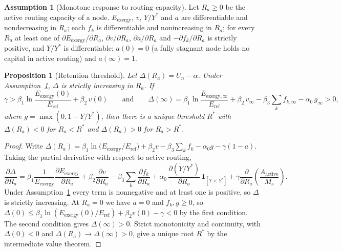 \documentclass[11pt,a4paper]{article}
\theoremstyle{definition}
\newtheorem{assumption}{Assumption}
\theoremstyle{plain}
\newtheorem{proposition}{Proposition}
\theoremstyle{remark}
\begin{document}
\begin{assumption}[Monotone response to routing capacity]\label{ass:mono}
Let $R_a \ge 0$ be the active routing capacity of a node. $E_{\mathrm{exergy}}$, $v$, $Y/Y^{*}$ and $a$ are differentiable and nondecreasing in $R_a$; each $f_k$ is differentiable and nonincreasing in $R_a$; for every $R_a$ at least one of $\partial E_{\mathrm{exergy}}/\partial R_a$, $\partial v/\partial R_a$, $\partial a/\partial R_a$ and $-\partial f_k/\partial R_a$ is strictly positive, and $Y/Y^{*}$ is differentiable; $a(0) = 0$ (a fully stagnant node holds no capital in active routing) and $a(\infty) = 1$.
\end{assumption}

\begin{proposition}[Retention threshold]\label{prop:retention}
Let $\Delta(R_a) = U_n - \alpha$. Under Assumption~\ref{ass:mono}, $\Delta$ is strictly increasing in $R_a$. If
\begin{equation}
\gamma > \beta_1 \ln\!\frac{E_{\mathrm{exergy}}(0)}{E_{\mathrm{ref}}} + \beta_2\, v(0)
\qquad\text{and}\qquad
\Delta(\infty) = \beta_1 \ln\!\frac{E_{\mathrm{exergy},\infty}}{E_{\mathrm{ref}}} + \beta_2\, v_\infty - \beta_3 \sum_k f_{k,\infty} - \alpha_0\, g_\infty > 0,
\end{equation}
where $g = \max(0, 1 - Y/Y^{*})$, then there is a unique threshold $R^{*}$ with $\Delta(R_a) < 0$ for $R_a < R^{*}$ and $\Delta(R_a) > 0$ for $R_a > R^{*}$.
\end{proposition}
\begin{proof}
Write $\Delta(R_a) = \beta_1 \ln\!\big(E_{\mathrm{exergy}}/E_{\mathrm{ref}}\big) + \beta_2 v - \beta_3 \sum_k f_k - \alpha_0 g - \gamma(1 - a)$. Taking the partial derivative with respect to active routing,
\begin{equation}
\frac{\partial \Delta}{\partial R_a}
= \beta_1 \frac{1}{E_{\mathrm{exergy}}} \frac{\partial E_{\mathrm{exergy}}}{\partial R_a}
+ \beta_2 \frac{\partial v}{\partial R_a}
- \beta_3 \sum_k \frac{\partial f_k}{\partial R_a}
+ \alpha_0\, \frac{\partial (Y/Y^{*})}{\partial R_a}\,\mathbf 1_{[Y < Y^{*}]}
+ \gamma \frac{\partial}{\partial R_a}\!\left( \frac{A_{\mathrm{active}}}{M_s} \right).
\end{equation}
Under Assumption~\ref{ass:mono} every term is nonnegative and at least one is positive, so $\Delta$ is strictly increasing. At $R_a = 0$ we have $a = 0$ and $f_k, g \ge 0$, so $\Delta(0) \le \beta_1 \ln(E_{\mathrm{exergy}}(0)/E_{\mathrm{ref}}) + \beta_2 v(0) - \gamma < 0$ by the first condition. The second condition gives $\Delta(\infty) > 0$. Strict monotonicity and continuity, with $\Delta(0) < 0$ and $\Delta(R_a) \to \Delta(\infty) > 0$, give a unique root $R^{*}$ by the intermediate value theorem. \qedhere
\end{proof}
\end{document}
